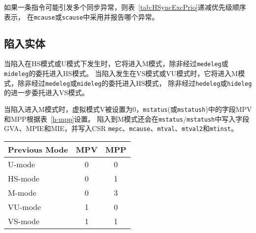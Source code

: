 如果一条指令可能引发多个同步异常，则表~\ref{tab:HSyncExcPrio}递减优先级顺序表示，
在{\tt mcause}或{\tt scause}中采用并报告哪个异常。

\FloatBarrier

\subsection{陷入实体}

当陷入在HS模式或U模式下发生时，它将进入M模式，除非经过{\tt medeleg}或{\tt mideleg}的委托进入HS模式。
当陷入发生在VS模式或VU模式时，它将进入M模式，除非经过{\tt medeleg}或{\tt mideleg}的委托进入HS模式，
除非经过{\tt hedeleg}或{\tt hideleg}的进一步委托进入VS模式。

当陷入进入M模式时，虚拟模式V被设置为0，{\tt mstatus}(或{\tt mstatush})中的字段MPV和MPP根据表~\ref{h-mpp}设置。
陷入到M模式还会在{\tt mstatus}/{\tt mstatush}中写入字段GVA、MPIE和MIE，并写入CSR {\tt mepc}、{\tt mcause}、{\tt mtval}、{\tt mtval2}和{\tt mtinst}。

\begin{table*}[h!]
\begin{center}
\begin{tabular}{|l|c|c|}
  \hline
  Previous Mode & MPV & MPP \\ \hline
  U-mode        & 0   & 0   \\
  HS-mode       & 0   & 1   \\
  M-mode        & 0   & 3   \\ \hline
  VU-mode       & 1   & 0   \\
  VS-mode       & 1   & 1   \\ \hline
\end{tabular}
\end{center}
\caption{
  在陷入到M模式之后，{\tt mstatus}/{\tt mstatush}的MPV和MPP字段。
当陷入返回，并且MPP=3时，忽略MPV。
}
\label{h-mpp}
\end{table*}

